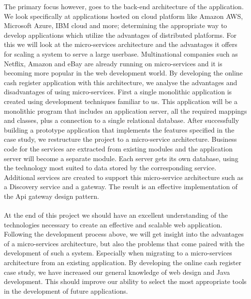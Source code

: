 \documentclass[12pt]{article}
\begin{document}
The primary focus however, goes to the back-end architecture of the application. We look speciﬁcally at applications hosted on cloud platform like Amazon AWS, Microsoft Azure, IBM cloud and more; determining the appropriate way to develop applications which utilize the advantages of distributed platforms. For this we will look at the micro-services architecture and the advantages it offers for scaling a system to serve a large userbase. Multinational companies such as Netﬂix, Amazon and eBay are already running on micro-services and it is becoming more popular in the web development world. By developing the online cash register application with this architecture, we analyse the advantages and disadvantages of using micro-services. First a single monolithic application is created using development techniques familiar to us. This application will be a monolithic program that includes an application server, all the required mappings and classes, plus a connection to a single relational database. After successfully building a prototype application that implements the features specified in the case study, we restructure the project to a micro-service architecture. Business code for the services are extracted from existing modules and the application server will become a separate module. Each server gets its own database, using the technology most suited to data stored by the corresponding service. Additional services are created to support this micro-service architecture such as a Discovery service and a gateway. The result is an effective implementation of the Api gateway design pattern. 
\\\\
At the end of this project we should have an excellent understanding of the technologies necessary to create an effective and scalable web application. Following the development process above, we will get insight into the advantages of a micro-services architecture, but also the problems that come paired with the development of such a system. Especially when migrating to a micro-services architecture from an existing application. By developing the online cash register case study, we have increased our general knowledge of web design and Java development. This should improve our ability to select the most appropriate tools in the development of future applications.



\end{document}
